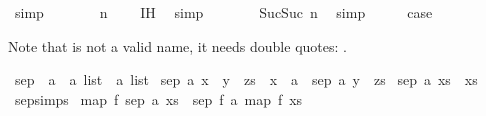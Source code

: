 \begin{isabellebody}
\ simp\isanewline
\ \ \isamarkupfalse%
\ \isamarkupfalse%
\ {\isachardoublequoteopen}{\isasymdots}\ {\isasymle}\ n\ {\isacharplus}{\kern0pt}\ {}{\isachardoublequoteclose}\ \isamarkupfalse%
\ {\isachardoublequoteopen}{}{\isachardot}{\kern0pt}IH{\isachardoublequoteclose}\ \isamarkupfalse%
\ simp\isanewline
\ \ \isamarkupfalse%
\ \isamarkupfalse%
\ {\isachardoublequoteopen}{\isasymdots}\ {\isacharequal}{\kern0pt}\ Suc{\isacharparenleft}{\kern0pt}Suc\ n{\isacharparenright}{\kern0pt}{\isachardoublequoteclose}\ \isamarkupfalse%
\ simp\isanewline
\ \ \isamarkupfalse%
\ \isamarkupfalse%
\ {\isacharquery}{\kern0pt}case\ \isacommand{{\isachardot}{\kern0pt}}\isamarkupfalse%
\isanewline
{}\isamarkupfalse%
%
\endisatagproof
{\isafoldproof}%
%
\isadelimproof
%
\endisadelimproof
%
\begin{isamarkuptext}%
Note that  is not a valid name, it needs double quotes: .%
\end{isamarkuptext}\isamarkuptrue%
\isamarkupfalse%
\ sep\ {\isacharcolon}{\kern0pt}{\isacharcolon}{\kern0pt}\ {\isachardoublequoteopen}{\isacharprime}{\kern0pt}a\ {\isasymRightarrow}\ {\isacharprime}{\kern0pt}a\ list\ {\isasymRightarrow}\ {\isacharprime}{\kern0pt}a\ list{\isachardoublequoteclose}\ \isanewline
{\isachardoublequoteopen}sep\ a\ {\isacharparenleft}{\kern0pt}x\ {\isacharhash}{\kern0pt}\ y\ {\isacharhash}{\kern0pt}\ zs{\isacharparenright}{\kern0pt}\ {\isacharequal}{\kern0pt}\ x\ {\isacharhash}{\kern0pt}\ a\ {\isacharhash}{\kern0pt}\ sep\ a\ {\isacharparenleft}{\kern0pt}y\ {\isacharhash}{\kern0pt}\ zs{\isacharparenright}{\kern0pt}{\isachardoublequoteclose}\ {\isacharbar}{\kern0pt}\isanewline
{\isachardoublequoteopen}sep\ a\ xs\ {\isacharequal}{\kern0pt}\ xs{\isachardoublequoteclose}\isanewline
\isanewline
{}\isamarkupfalse%
\ sep{\isachardot}{\kern0pt}simps\isanewline
\isanewline
{}\isamarkupfalse%
\ {\isachardoublequoteopen}map\ f\ {\isacharparenleft}{\kern0pt}sep\ a\ xs{\isacharparenright}{\kern0pt}\ {\isacharequal}{\kern0pt}\ sep\ {\isacharparenleft}{\kern0pt}f\ a{\isacharparenright}{\kern0pt}\ {\isacharparenleft}{\kern0pt}map\ f\ xs{\isacharparenright}{\kern0pt}{\isachardoublequoteclose}\isanewline
%
\isadelimproof
%
\endisadelimproof

\end{isabellebody}
